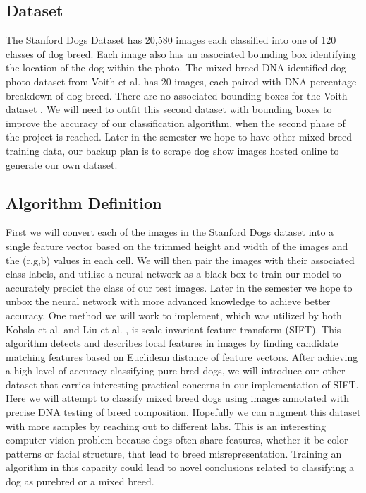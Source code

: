 \documentclass[12pt]{article}
\begin{document}
\subsection{Dataset}

The Stanford Dogs Dataset has 20,580 images each classified into one of 120 classes of dog breed. \cite{khosla2011novel} Each image also has an associated bounding box identifying the location of the dog within the photo. The mixed-breed DNA identified dog photo dataset from Voith et al. \cite{voith2009comparison} has 20 images, each paired with DNA percentage breakdown of dog breed. There are no associated bounding boxes for the Voith dataset \cite{voith2009comparison}. We will need to outfit this second dataset with bounding boxes to improve the accuracy of our classification algorithm, when the second phase of the project is reached. Later in the semester we hope to have other mixed breed training data, our backup plan is to scrape dog show images hosted online to generate our own dataset. 

\subsection{Algorithm Definition}
First we will convert each of the images in the Stanford Dogs dataset \cite{khosla2011novel} into a single feature vector based on the trimmed height and width of the images and the (r,g,b) values in each cell. We will then pair the images with their associated class labels, and utilize a neural network as a black box to train our model to accurately predict the class of our test images. Later in the semester we hope to unbox the neural network with more advanced knowledge to achieve better accuracy. One method we will work to implement, which was utilized by both Kohsla et al. \cite{khosla2011novel} and Liu et al. \cite{liu2012dog}, is scale-invariant feature transform (SIFT). This algorithm detects and describes local features in images by finding candidate matching features based on Euclidean distance of feature vectors.  \cite{lowe2004distinctive} After achieving a high level of accuracy classifying pure-bred dogs, we will introduce our other dataset \cite{voith2009comparison} that carries interesting practical concerns in our implementation of SIFT. Here we will attempt to classify mixed breed dogs using images annotated with precise DNA testing of breed composition. Hopefully we can augment this dataset with more samples by reaching out to different labs. This is an interesting computer vision problem because dogs often share features, whether it be color patterns or facial structure, that lead to breed misrepresentation.  Training an algorithm in this capacity could lead to novel conclusions related to classifying a dog as purebred or a mixed breed. 
 
\end{document}

